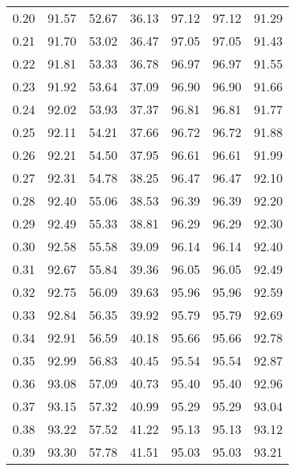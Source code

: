 \begin{tabular}{|c|c|c|c|c|c|c|}
      0.20 &     91.57 &     52.67 &      36.13 &   97.12 &      97.12 &         91.29 \\
      0.21 &     91.70 &     53.02 &      36.47 &   97.05 &      97.05 &         91.43 \\
      0.22 &     91.81 &     53.33 &      36.78 &   96.97 &      96.97 &         91.55 \\
      0.23 &     91.92 &     53.64 &      37.09 &   96.90 &      96.90 &         91.66 \\
      0.24 &     92.02 &     53.93 &      37.37 &   96.81 &      96.81 &         91.77 \\
      0.25 &     92.11 &     54.21 &      37.66 &   96.72 &      96.72 &         91.88 \\
      0.26 &     92.21 &     54.50 &      37.95 &   96.61 &      96.61 &         91.99 \\
      0.27 &     92.31 &     54.78 &      38.25 &   96.47 &      96.47 &         92.10 \\
      0.28 &     92.40 &     55.06 &      38.53 &   96.39 &      96.39 &         92.20 \\
      0.29 &     92.49 &     55.33 &      38.81 &   96.29 &      96.29 &         92.30 \\
      0.30 &     92.58 &     55.58 &      39.09 &   96.14 &      96.14 &         92.40 \\
      0.31 &     92.67 &     55.84 &      39.36 &   96.05 &      96.05 &         92.49 \\
      0.32 &     92.75 &     56.09 &      39.63 &   95.96 &      95.96 &         92.59 \\
      0.33 &     92.84 &     56.35 &      39.92 &   95.79 &      95.79 &         92.69 \\
      0.34 &     92.91 &     56.59 &      40.18 &   95.66 &      95.66 &         92.78 \\
      0.35 &     92.99 &     56.83 &      40.45 &   95.54 &      95.54 &         92.87 \\
      0.36 &     93.08 &     57.09 &      40.73 &   95.40 &      95.40 &         92.96 \\
      0.37 &     93.15 &     57.32 &      40.99 &   95.29 &      95.29 &         93.04 \\
      0.38 &     93.22 &     57.52 &      41.22 &   95.13 &      95.13 &         93.12 \\
      0.39 &     93.30 &     57.78 &      41.51 &   95.03 &      95.03 &         93.21 \\

\end{tabular}
